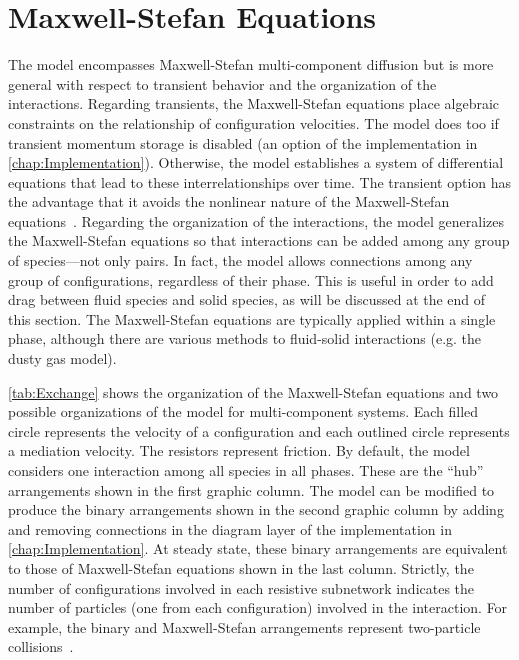 \section{Maxwell-Stefan Equations}
\label{sec:MS}

The model encompasses Maxwell-Stefan multi-component diffusion but is more general with respect to transient behavior and the organization of the interactions.  Regarding transients, the Maxwell-Stefan equations place algebraic constraints on the relationship of configuration velocities.  The model does too if transient momentum storage is disabled (an option of the implementation in \autoref{chap:Implementation}).  Otherwise, the model establishes a system of differential equations that lead to these interrelationships over time.  The transient option has the advantage that it avoids the nonlinear nature of the Maxwell-Stefan equations~\cite{Cussler1997, Boudin2008}.  Regarding the organization of the interactions, the model generalizes the Maxwell-Stefan equations so that interactions can be added among any group of species---not only pairs.  In fact, the model allows connections among any group of configurations, regardless of their phase.  This is useful in order to add drag between fluid species and solid species, as will be discussed at the end of this section.  The Maxwell-Stefan equations are typically applied within a single phase, although there are various methods to fluid-solid interactions (e.g. the dusty gas model).

\autoref{tab:Exchange} shows the organization of the Maxwell-Stefan equations and two possible organizations of the model for multi-component systems.  Each filled circle represents the velocity of a configuration and each outlined circle represents a mediation velocity.  The resistors represent friction.  By default, the model considers one interaction among all species in all phases.  These are the ``hub'' arrangements shown in the first graphic column.  The model can be modified to produce the binary arrangements shown in the second graphic column by adding and removing connections in the diagram layer of the implementation in \autoref{chap:Implementation}.  At steady state, these binary arrangements are equivalent to those of Maxwell-Stefan equations shown in the last column.  Strictly, the number of configurations involved in each resistive subnetwork indicates the number of particles (one from each configuration) involved in the interaction.  For example, the binary and Maxwell-Stefan arrangements represent two-particle collisions~\cite{Taylor1993}.

